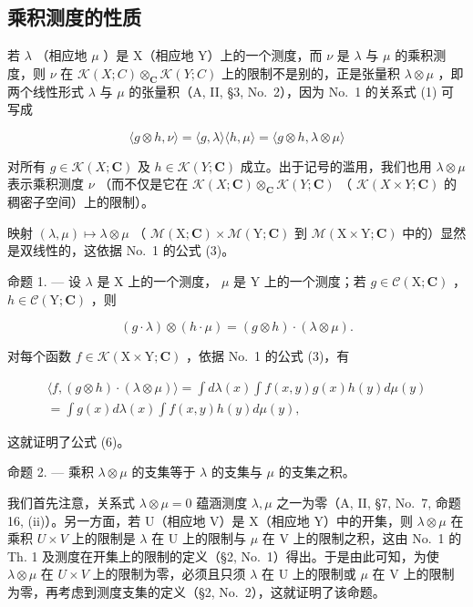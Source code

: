 \subsection{乘积测度的性质}

若 \(\lambda\) （相应地 \(\mu\) ）是 X（相应地 Y）上的一个测度，而 \(\nu\) 是 \(\lambda\) 与 \(\mu\) 的乘积测度，则 \(\nu\) 在 \(\mathcal{K}(X;C)\otimes_{\mathbf{C}}\mathcal{K}(Y;C)\) 上的限制不是别的，正是张量积 \(\lambda\otimes\mu\) ，即两个线性形式 \(\lambda\) 与 \(\mu\) 的张量积（A, II, §3, No.~2），因为 No.~1 的关系式 (1) 可写成

\[
\langle g \otimes h, \nu \rangle = \langle g, \lambda \rangle \langle h, \mu \rangle = \langle g \otimes h, \lambda \otimes \mu \rangle
\]

对所有 \(g \in \mathcal{K}(X; \mathbf{C})\) 及 \(h \in \mathcal{K}(Y; \mathbf{C})\) 成立。出于记号的滥用，我们也用 \(\lambda \otimes \mu\) 表示乘积测度 \(\nu\) （而不仅是它在 \(\mathcal{K}(X; \mathbf{C}) \otimes_{\mathbf{C}} \mathcal{K}(Y; \mathbf{C})\) （ \(\mathcal{K}(X \times Y; \mathbf{C})\) 的稠密子空间）上的限制）。

映射 \((\lambda, \mu) \mapsto \lambda \otimes \mu\) （ \(\mathcal{M}(\mathrm{X}; \mathbf{C}) \times \mathcal{M}(\mathrm{Y}; \mathbf{C})\) 到 \(\mathcal{M}(\mathrm{X} \times \mathrm{Y}; \mathbf{C})\) 中的）显然是双线性的，这依据 No.~1 的公式 (3)。

命题 1. --- 设 \(\lambda\) 是 X 上的一个测度， \(\mu\) 是 Y 上的一个测度；若 \(g \in \mathcal{C}(\mathrm{X};\mathbf{C})\) ， \(h \in \mathcal{C}(\mathrm{Y};\mathbf{C})\) ，则

\[
(g \cdot \lambda) \otimes (h \cdot \mu) = (g \otimes h) \cdot (\lambda \otimes \mu).\tag{6}
\]

对每个函数 \(f \in \mathcal{K}(\mathrm{X} \times \mathrm{Y}; \mathbf{C})\) ，依据 No.~1 的公式 (3)，有

\[
\begin{array}{c} \langle f, (g \otimes h) \cdot (\lambda \otimes \mu) \rangle = \int d \lambda (x) \int f (x, y) g (x) h (y) d \mu (y) \\ = \int g (x) d \lambda (x) \int f (x, y) h (y) d \mu (y), \end{array}
\]

这就证明了公式 (6)。

命题 2. --- 乘积 \(\lambda \otimes \mu\) 的支集等于 \(\lambda\) 的支集与 \(\mu\) 的支集之积。

我们首先注意，关系式 \(\lambda \otimes \mu = 0\) 蕴涵测度 \(\lambda, \mu\) 之一为零（A, II, §7, No.~7, 命题 16, (ii)）。另一方面，若 U（相应地 V）是 X（相应地 Y）中的开集，则 \(\lambda\otimes\mu\) 在乘积 \(U\times V\) 上的限制是 \(\lambda\) 在 U 上的限制与 \(\mu\) 在 V 上的限制之积，这由 No.~1 的 Th. 1 及测度在开集上的限制的定义（§2, No.~1）得出。于是由此可知，为使 \(\lambda\otimes\mu\) 在 \(U\times V\) 上的限制为零，必须且只须 \(\lambda\) 在 U 上的限制或 \(\mu\) 在 V 上的限制为零，再考虑到测度支集的定义（§2, No.~2），这就证明了该命题。

